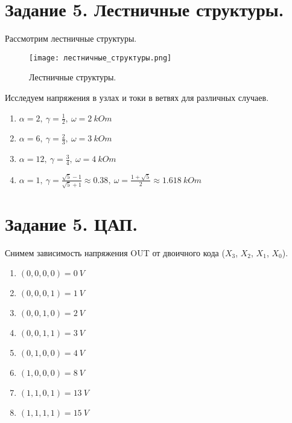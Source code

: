     \section*{Задание 5. Лестничные структуры.}

    \noindent Рассмотрим лестничные структуры.
    \begin{figure}[h!]
        \centering
        \texttt{[image: лестничные\_структуры.png]}
        \caption{Лестничные структуры.}
    \end{figure}

    \noindent Исследуем напряжения в узлах и токи в ветвях для различных случаев.

    \begin{enumerate}
        \item $\alpha = 2,  ~ \gamma = \frac{1}{2}, ~ \omega = 2 ~ kOm$
        \item $\alpha = 6,  ~ \gamma = \frac{2}{3}, ~ \omega = 3 ~ kOm$
        \item $\alpha = 12, ~ \gamma = \frac{3}{4}, ~ \omega = 4 ~ kOm$
        \item $\alpha = 1,  ~ \gamma = \frac{\sqrt{5} - 1}{\sqrt{5} + 1} \approx 0.38, ~ \omega = \frac{1 + \sqrt{5}}{2} \approx 1.618 ~ kOm$
    \end{enumerate}

    \section*{Задание 5. ЦАП.}

    \noindent Снимем зависимость напряжения OUT от двоичного кода ($X_3$, $X_2$, $X_1$, $X_0$).

    \begin{enumerate}
        \item $(0, 0, 0, 0) = 0 ~ V$
        \item $(0, 0, 0, 1) = 1 ~ V$
        \item $(0, 0, 1, 0) = 2 ~ V$
        \item $(0, 0, 1, 1) = 3 ~ V$
        \item $(0, 1, 0, 0) = 4 ~ V$
        \item $(1, 0, 0, 0) = 8 ~ V$
        \item $(1, 1, 0, 1) = 13 ~ V$
        \item $(1, 1, 1, 1) = 15 ~ V$
    \end{enumerate}

